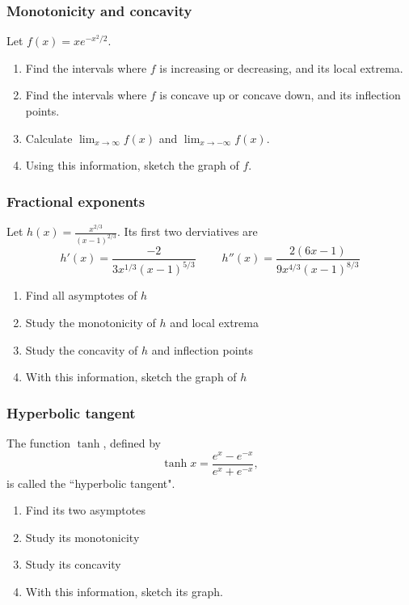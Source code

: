 \documentclass[14pt]{beamer}
\begin{document}
\begin{frame}[t]
	\frametitle{Monotonicity and concavity}

	Let $\displaystyle f(x) = x e^{-x^2/2}$.

	\begin{enumerate}
		\item Find the intervals where $f$ is increasing or decreasing, and its
			local extrema.

		\item Find the intervals where $f$ is concave up or concave down, and its
			inflection points.

		\item Calculate $\displaystyle \lim_{x \to \infty}f(x)$ and $\displaystyle \lim
			_{x \to - \infty}f(x)$.

		\item Using this information, sketch the graph of $f$.
	\end{enumerate}
\end{frame}

\begin{frame}[t]
	\frametitle{Fractional exponents}

	Let $\displaystyle h(x) = \frac{x^{2/3}}{(x-1)^{2/3}}$. Its first two derviatives
	are
	\begin{equation*}
		h'(x) = \frac{-2}{3x^{1/3}(x-1)^{5/3}}\; \quad \quad h''(x) = \frac{2(6x-1)}{9x^{4/3}(x-1)^{8/3}}
	\end{equation*}

	\begin{enumerate}
		\item Find all asymptotes of $h$

		\item Study the monotonicity of $h$ and local extrema

		\item Study the concavity of $h$ and inflection points

		\item With this information, sketch the graph of $h$
	\end{enumerate}
\end{frame}

\begin{frame}[t]
	\frametitle{Hyperbolic tangent}

	The function $\tanh$, defined by
	\[
		\tanh x = \frac{e^{x}- e^{-x}}{e^{x}+ e^{-x}},
	\]
	is called the ``hyperbolic tangent".
	\begin{enumerate}
		\item Find its two asymptotes

		\item Study its monotonicity

		\item Study its concavity

		\item With this information, sketch its graph.
	\end{enumerate}
\end{frame}
\end{document}
